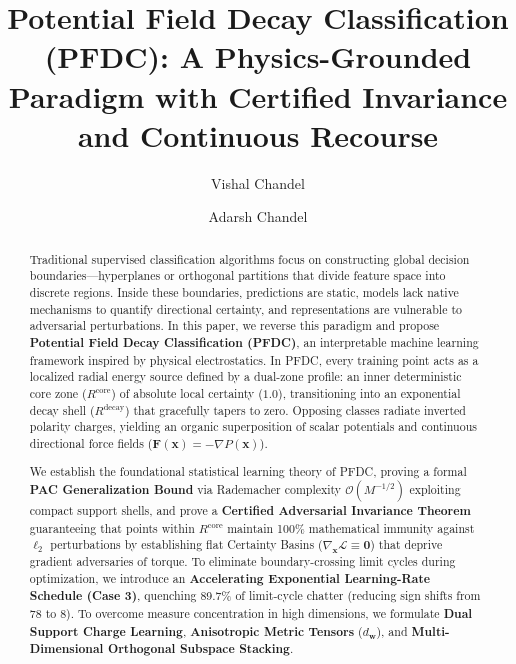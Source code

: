 \documentclass[preprint,review,12pt]{elsarticle}
\begin{document}
\begin{frontmatter}

\title{Potential Field Decay Classification (PFDC): A Physics-Grounded Paradigm with Certified Invariance and Continuous Recourse}

\author{Vishal Chandel}
\author{Adarsh Chandel}

\begin{abstract}
Traditional supervised classification algorithms focus on constructing global decision boundaries---hyperplanes or orthogonal partitions that divide feature space into discrete regions. Inside these boundaries, predictions are static, models lack native mechanisms to quantify directional certainty, and representations are vulnerable to adversarial perturbations. In this paper, we reverse this paradigm and propose \textbf{Potential Field Decay Classification (PFDC)}, an interpretable machine learning framework inspired by physical electrostatics. In PFDC, every training point acts as a localized radial energy source defined by a dual-zone profile: an inner deterministic core zone ($R^{\mathrm{core}}$) of absolute local certainty ($1.0$), transitioning into an exponential decay shell ($R^{\mathrm{decay}}$) that gracefully tapers to zero. Opposing classes radiate inverted polarity charges, yielding an organic superposition of scalar potentials and continuous directional force fields ($\mathbf{F}(\mathbf{x}) = -\nabla P(\mathbf{x})$).

We establish the foundational statistical learning theory of PFDC, proving a formal \textbf{PAC Generalization Bound} via Rademacher complexity $\mathcal{O}(M^{-1/2})$ exploiting compact support shells, and prove a \textbf{Certified Adversarial Invariance Theorem} guaranteeing that points within $R^{\mathrm{core}}$ maintain 100\% mathematical immunity against $\ell_2$ perturbations by establishing flat Certainty Basins ($\nabla_{\mathbf{x}} \mathcal{L} \equiv \mathbf{0}$) that deprive gradient adversaries of torque. To eliminate boundary-crossing limit cycles during optimization, we introduce an \textbf{Accelerating Exponential Learning-Rate Schedule (Case 3)}, quenching 89.7\% of limit-cycle chatter (reducing sign shifts from 78 to 8). To overcome measure concentration in high dimensions, we formulate \textbf{Dual Support Charge Learning}, \textbf{Anisotropic Metric Tensors} ($d_{\mathbf{w}}$), and \textbf{Multi-Dimensional Orthogonal Subspace Stacking}.


\end{abstract}
\end{frontmatter}
\end{document}
